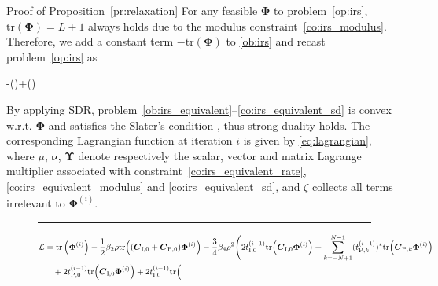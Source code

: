 \documentclass[journal]{IEEEtran}
\begin{document}
	\begin{appendix}
		\begin{subsection}{Proof of Proposition~\ref{pr:relaxation}}\label{ap:relaxation}
			For any feasible $\boldsymbol{\Phi}$ to problem~\eqref{op:irs}, $\mathrm{tr}(\boldsymbol{\Phi})=L+1$ always holds due to the modulus constraint~\eqref{co:irs_modulus}. Therefore, we add a constant term $-\mathrm{tr}(\boldsymbol{\Phi})$ to \eqref{ob:irs} and recast problem~\eqref{op:irs} as
			\begin{maxi!}
				{\scriptstyle{\boldsymbol{\Phi}}}{-(\boldsymbol{\Phi})+(\boldsymbol{\Phi})}{\label{op:irs_equivalent}}{\label{ob:irs_equivalent}}
				\label{co:irs_equivalent_rate}
				\label{co:irs_equivalent_modulus}
				\label{co:irs_equivalent_sd}
			\end{maxi!}
			By applying SDR, problem~\eqref{ob:irs_equivalent}--\eqref{co:irs_equivalent_sd} is convex w.r.t. $\boldsymbol{\Phi}$ and satisfies the Slater's condition \cite{Boyd2004}, thus strong duality holds. The corresponding Lagrangian function at iteration $i$ is given by \eqref{eq:lagrangian}, where $\mu$, $\boldsymbol{\nu}$, $\boldsymbol{\Upsilon}$ denote respectively the scalar, vector and matrix Lagrange multiplier associated with constraint~\eqref{co:irs_equivalent_rate}, \eqref{co:irs_equivalent_modulus} and \eqref{co:irs_equivalent_sd}, and $\zeta$ collects all terms irrelevant to $\boldsymbol{\Phi}^{(i)}$.
			\begin{figure*}[!b]
				\hrule
				\begin{align}\label{eq:lagrangian}
					\mathcal{L}
					& = \mathrm{tr}\left(\boldsymbol{\Phi}^{(i)}\right) - \frac{1}{2} \beta_2 \rho \mathrm{tr}\Bigl(
							(\boldsymbol{C}_{\mathrm{I},0} + \boldsymbol{C}_{\mathrm{P},0}) \boldsymbol{\Phi}^{(i)}
						\Bigr) - \frac{3}{4} \beta_4 \rho^2 \Biggl(
							2 t_{\mathrm{I},0}^{(i-1)} \mathrm{tr}\Bigl(
								\boldsymbol{C}_{\mathrm{I},0} \boldsymbol{\Phi}^{(i)}
							\Bigr) + \sum_{k=-N+1}^{N-1} (t_{\mathrm{P},k}^{(i-1)})^* \mathrm{tr}\Bigl(
								\boldsymbol{C}_{\mathrm{P},k} \boldsymbol{\Phi}^{(i)}
							\Bigr)\nonumber\\
					& \quad + 2 t_{\mathrm{P},0}^{(i-1)} \mathrm{tr}\Bigl(
							\boldsymbol{C}_{\mathrm{I},0} \boldsymbol{\Phi}^{(i)}
						\Bigr) + 2 t_{\mathrm{I},0}^{(i-1)} \mathrm{tr}\Bigl(

\end{align}
\end{figure*}
\end{subsection}
\end{appendix}
\end{document}
